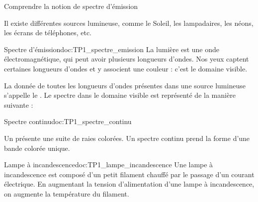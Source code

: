 \teteSndLumi

\vspace*{-36pt}


\begin{objectifs}
  \item Comprendre la notion de spectre d'émission
\end{objectifs}

\begin{contexte}
  Il existe différentes sources lumineuse, comme le Soleil, les lampadaires, les néons, les écrans de téléphones, etc.
  
\end{contexte}


\begin{doc}{Spectre d'émission}{doc:TP1_spectre_emission}
  La lumière est une onde électromagnétique, qui peut avoir plusieurs longueurs d'ondes.
  Nos yeux captent certaines longueurs d'ondes et y associent une couleur : c'est le domaine visible.
  
  \begin{encart}
    La donnée de toutes les longueurs d'ondes présentes dans une source lumineuse s'appelle le .
    Le spectre dans le domaine visible est représenté de la manière suivante :
  \end{encart}
  \vspace{-22pt}
  \begin{center}
  \end{center}
\end{doc}



\begin{doc}{Spectre continu}{doc:TP1_spectre_continu}
  \begin{encart}
    Un  présente une suite de raies colorées.
    Un spectre continu prend la forme d'une bande colorée unique.
  \end{encart}
\end{doc}

\begin{doc}{Lampe à incandescence}{doc:TP1_lampe_incandescence}  
  Une lampe à incandescence est composé d'un petit filament chauffé par le passage d'un courant électrique.
  En augmentant la tension d'alimentation d'une lampe à incandescence, on augmente la température du filament.
\end{doc}


